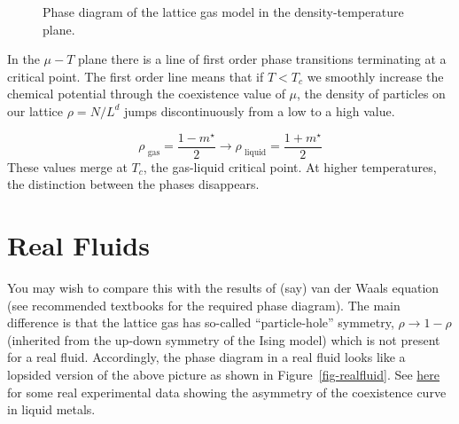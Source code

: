 \documentclass[
  letterpaper,
  enabledeprecatedfontcommands]{report}
\begin{document}
\begin{figure}


\caption{\label{fig-lattgas}Phase diagram of the lattice gas model in
the density-temperature plane.}

\end{figure}%

In the \(\mu-T\) plane there is a line of first order phase transitions
terminating at a critical point. The first order line means that if
\(T<T_c\) we smoothly increase the chemical potential through the
coexistence value of \(\mu\), the density of particles on our lattice
\(\rho=N/L^d\) jumps discontinuously from a low to a high value.

\[\rho_\textrm{ gas}=\frac{1-m^\star}{2} \to \rho_\textrm{ liquid}=\frac{1+m^\star}{2}
\] These values merge at \(T_c\), the gas-liquid critical point. At
higher temperatures, the distinction between the phases disappears.

\section{Real Fluids}\label{real-fluids}

You may wish to compare this with the results of (say) van der Waals
equation (see recommended textbooks for the required phase diagram). The
main difference is that the lattice gas has so-called ``particle-hole''
symmetry, \(\rho\to 1-\rho\) (inherited from the up-down symmetry of the
Ising model) which is not present for a real fluid. Accordingly, the
phase diagram in a real fluid looks like a lopsided version of the above
picture as shown in Figure~\ref{fig-realfluid}. See
\href{https://journals.aps.org/prl/pdf/10.1103/PhysRevLett.55.2160}{here}
for some real experimental data showing the asymmetry of the coexistence
curve in liquid metals.
\end{document}
